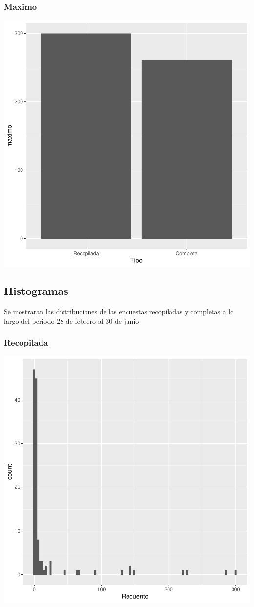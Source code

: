 \documentclass{article}
\begin{document}
\subsubsection{Maximo}

\includegraphics{seguimento2-008}

\subsection{Histogramas}
Se mostraran las distribuciones de las encuestas recopiladas y completas a lo largo del periodo 28 de febrero al 30 de junio

\subsubsection{Recopilada}

\includegraphics{seguimento2-009}
\end{document}
